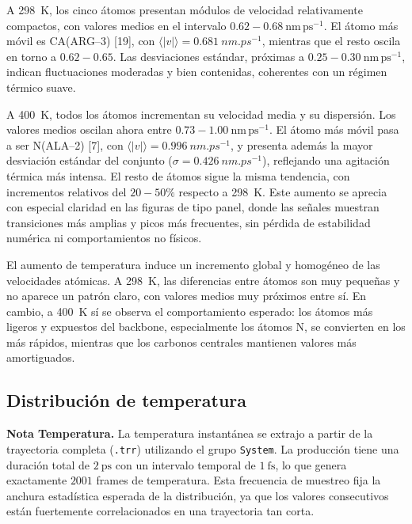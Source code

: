 \documentclass[12pt,a4paper]{article}
\begin{document}
A \SI{298}{K}, los cinco átomos presentan módulos de velocidad relativamente 
compactos, con valores medios en el intervalo 
\(0.62{-}0.68~\mathrm{nm\,ps^{-1}}\). El átomo más móvil es CA(ARG–3) [19], con 
\(\langle|v|\rangle=\SI{0.681}{nm.ps^{-1}}\), mientras que el resto oscila en torno 
a \(0.62{-}0.65\). Las desviaciones estándar, próximas a 
\(0.25{-}0.30~\mathrm{nm\,ps^{-1}}\), indican fluctuaciones moderadas y bien 
contenidas, coherentes con un régimen térmico suave.

A \SI{400}{K}, todos los átomos incrementan su velocidad media y su dispersión. 
Los valores medios oscilan ahora entre 
\(0.73{-}1.00~\mathrm{nm\,ps^{-1}}\). El átomo más móvil pasa a ser N(ALA–2) [7], 
con \(\langle|v|\rangle=\SI{0.996}{nm.ps^{-1}}\), y presenta además la mayor 
desviación estándar del conjunto (\(\sigma=\SI{0.426}{nm.ps^{-1}}\)), reflejando 
una agitación térmica más intensa. El resto de átomos sigue la misma tendencia, 
con incrementos relativos del \(20{-}50\%\) respecto a \SI{298}{K}. Este aumento 
se aprecia con especial claridad en las figuras de tipo panel, donde las 
señales muestran transiciones más amplias y picos más frecuentes, sin pérdida 
de estabilidad numérica ni comportamientos no físicos.

El aumento de temperatura induce un incremento global y homogéneo de las
velocidades atómicas. A \SI{298}{K}, las diferencias entre átomos son muy
pequeñas y no aparece un patrón claro, con valores medios muy próximos entre
sí. En cambio, a \SI{400}{K} sí se observa el comportamiento esperado: los
átomos más ligeros y expuestos del backbone, especialmente los átomos N,
se convierten en los más rápidos, mientras que los carbonos centrales
mantienen valores más amortiguados.

\subsection{Distribución de temperatura}

\noindent\textbf{Nota Temperatura.} La temperatura instantánea se extrajo a partir de la
trayectoria completa (\texttt{.trr}) utilizando el grupo \texttt{System}. La producción
tiene una duración total de \(2~\mathrm{ps}\) con un intervalo temporal de
\(1~\mathrm{fs}\), lo que genera exactamente \(2001\) frames de temperatura. Esta
frecuencia de muestreo fija la anchura estadística esperada de la distribución,
ya que los valores consecutivos están fuertemente correlacionados en una
trayectoria tan corta.
\end{document}
